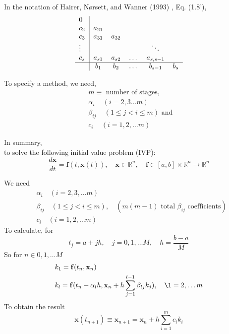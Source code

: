 \documentclass[10pt]{amsart}
\begin{document}
\begin{multicols*}{2}
In the notation of Hairer, N\o rsett, and Wanner (1993) \cite{HNW1993}, Eq. (1.8'),
\begin{equation}
\begin{tabular}{ l|c c c c c }
	0 & & & & & \\
	$c_2$ & $a_{21}$ &  & & & \\ 
	$c_3$ & $a_{31}$ & $a_{32}$ & & & \\ 
	$\vdots$ &  & & & $\ddots$ & \\ 
	$c_s$ & $a_{s1}$ & $a_{s2}$ & \dots & $a_{s, s-1}$ & \\
	\hline 
	& $b_1$ & $b_2$ & \dots & $b_{s-1}$ & $b_s$ \\	
\end{tabular}
\end{equation}


To specify a method, we need, 
\begin{equation}
\begin{aligned}
	& m \equiv \text{ number of stages, } \\
	& \alpha_i \quad \, (i= 2, 3 \dots m) \\
	& \beta_{ij} \quad \, (1 \leq j < i \leq m) \text{ and } \\
	& c_i \quad \, (i = 1, 2, \dots m)	
\end{aligned}
\end{equation}

In summary, \\
to solve the following initial value problem (IVP):
\begin{equation}
\boxed{
\frac{d\mathbf{x}}{dt} = \mathbf{f}(t, \mathbf{x}(t)), \quad \mathbf{x} \in \mathbb{R}^n, \quad \mathbf{f} \in [a, b] \times \mathbb{R}^n \to \mathbb{R}^n
}
\end{equation}

We need
\begin{equation}
\begin{aligned}
& \alpha_i \quad (i = 2, 3, \dots m) \\
& \beta_{ij} \quad (1 \leq j < i \leq m) , \quad (m(m-1) \text{ total $\beta_{ij}$ coefficients}) \\
& c_i  \quad (i = 1, 2, \dots m)	
\end{aligned}
\end{equation}
To calculate, for 
\begin{equation}
	\boxed{
		t_j = a+jh, \quad j=0, 1, \dots M, \quad h = \frac{b-a}{M} }
\end{equation}
So for $n \in 0 ,1 ,\dots M$
\begin{equation}
	\begin{aligned}
& 	k_1 = \mathbf{f}(t_n, \mathbf{x}_n) \\
& k_l = \mathbf{f}(t_n + \alpha_l h, \mathbf{x}_n + h \sum_{j=1}^{l-1} \beta_{lj} k_j) , \quad \l = 2, \dots m
	\end{aligned}	
\end{equation}
To obtain the result
\begin{equation}
	\mathbf{x}(t_{n+1}) \equiv \mathbf{x}_{n+1} = \mathbf{x}_{n} + h \sum_{i=1}^m c_i k_i
\end{equation}


\end{multicols*}
\end{document}
